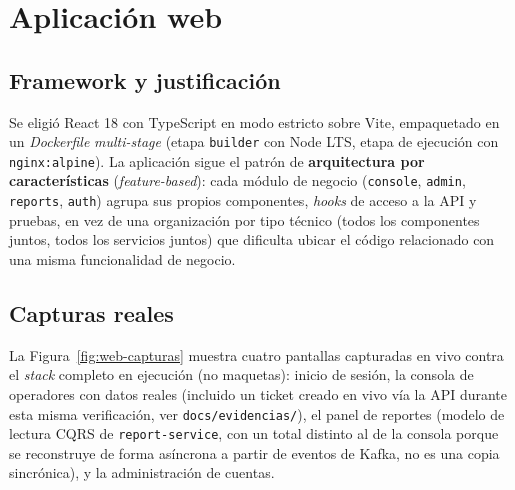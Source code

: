 \section{Aplicación web}
\label{sec:web}

\subsection{Framework y justificación}

Se eligió React 18 con TypeScript en modo estricto sobre Vite, empaquetado en un
\emph{Dockerfile} \emph{multi-stage} (etapa \texttt{builder} con Node LTS, etapa de ejecución con
\texttt{nginx:alpine}). La aplicación sigue el patrón de \textbf{arquitectura por
características} (\emph{feature-based}): cada módulo de negocio (\texttt{console},
\texttt{admin}, \texttt{reports}, \texttt{auth}) agrupa sus propios componentes, \emph{hooks} de
acceso a la API y pruebas, en vez de una organización por tipo técnico (todos los componentes
juntos, todos los servicios juntos) que dificulta ubicar el código relacionado con una misma
funcionalidad de negocio.

\subsection{Capturas reales}
\label{sec:web-capturas}

La Figura~\ref{fig:web-capturas} muestra cuatro pantallas capturadas en vivo contra el
\emph{stack} completo en ejecución (no maquetas): inicio de sesión, la consola de operadores con
datos reales (incluido un ticket creado en vivo vía la API durante esta misma verificación, ver
\texttt{docs/evidencias/}), el panel de reportes (modelo de lectura CQRS de
\texttt{report-service}, con un total distinto al de la consola porque se reconstruye de forma
asíncrona a partir de eventos de Kafka, no es una copia sincrónica), y la administración de
cuentas.

